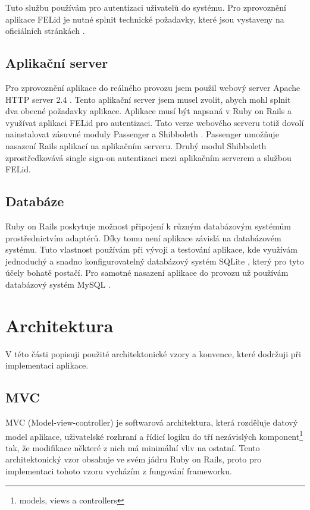 Tuto službu používám pro autentizaci uživatelů do systému. Pro zprovoznění aplikace FELid je nutné splnit technické požadavky, které jsou vystaveny na oficiálních stránkách \cite{felid_pozadavky}.

\subsection{Aplikační server}
\label{apache}
Pro zprovoznění aplikace do reálného provozu jsem použil webový server Apache HTTP server 2.4 \cite{apache}. Tento aplikační server jsem musel zvolit, abych mohl splnit dva obecné požadavky aplikace. Aplikace musí být napsaná v Ruby on Rails a využívat aplikaci FELid pro autentizaci. Tato verze webového serveru totiž dovolí nainstalovat zásuvné moduly Passenger \cite{passenger} a Shibboleth \cite{shibboleth}. Passenger umožňuje nasazení Rails aplikací na aplikačním serveru. Druhý modul Shibboleth zprostředkovává single sign-on autentizaci mezi aplikačním serverem a službou FELid.

\subsection{Databáze}
Ruby on Rails poskytuje možnost připojení k různým databázovým systémům prostřednictvím adaptérů. Díky tomu není aplikace závislá na databázovém systému. Tuto vlastnost používám při vývoji a testování aplikace, kde využívám jednoduchý a snadno konfigurovatelný databázový systém SQLite \cite{sqlite}, který pro tyto účely bohatě postačí. Pro samotné nasazení aplikace do provozu už používám databázový systém MySQL \cite{mysql}.

\section{Architektura}
V této části popisuji použité architektonické vzory a konvence, které dodržuji při implementaci aplikace.

\subsection{MVC}
\label{mvc}
MVC (Model-view-controller) \cite{mvc} je softwarová architektura, která rozděluje datový model aplikace, uživatelské rozhraní a řídicí logiku do tří nezávislých komponent\footnote{models, views a controllers} tak, že modifikace některé z nich má minimální vliv na ostatní. Tento architektonický vzor obsahuje ve svém jádru Ruby on Rails, proto pro implementaci tohoto vzoru vycházím z fungování frameworku.

